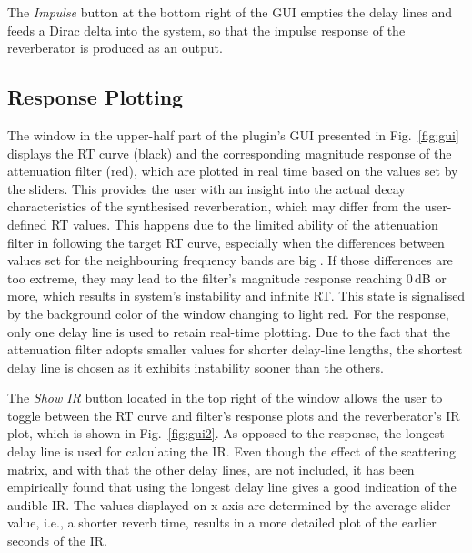 \documentclass[twoside,a4paper]{article}
\begin{document}
The \textit{Impulse} button at the bottom right of the GUI empties the delay lines and feeds a Dirac delta into the system, so that the impulse response of the reverberator is produced as an output.





\subsection{Response Plotting}
The window in the upper-half part of the plugin's GUI presented in Fig.~\ref{fig:gui} displays the RT curve (black) and the corresponding magnitude response of the attenuation filter (red), which are plotted in real time based on the values set by the sliders. This provides the user with an insight into the actual decay characteristics of the synthesised reverberation, which may differ from the user-defined RT values. This happens due to the limited ability of the attenuation filter in following the target RT curve, especially when the differences between values set for the neighbouring frequency bands are big \cite{prawda:2019:improved}. If those differences are too extreme, they may lead to the filter's magnitude response reaching 0\,dB or more, which results in system's instability and infinite RT. This state is signalised by the background color of the window changing to light red. For the response, only one delay line is used to retain real-time plotting. Due to the fact that the attenuation filter adopts smaller values for shorter delay-line lengths, the shortest delay line is chosen as it exhibits instability sooner than the others.  


The \textit{Show IR} button located in the top right of the window allows the user to toggle between the RT curve and filter's response plots and the reverberator's IR plot, which is shown in Fig.~\ref{fig:gui2}. As opposed to the response, the longest delay line is used for calculating the IR. Even though the effect of the scattering matrix, and with that the other delay lines, are not included, it has been empirically found that using the longest delay line gives a good indication of the audible IR. The values displayed on x-axis are determined by the average slider value, i.e., a shorter reverb time, results in a more detailed plot of the earlier seconds of the IR.
\end{document}
